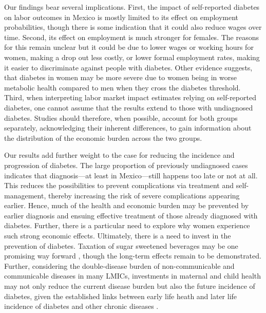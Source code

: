 \documentclass[12pt,english]{article}
\begin{document}
Our findings bear several implications. First, the impact of self-reported diabetes on labor outcomes in Mexico is mostly limited to its effect on employment probabilities, though there is some indication that it could also reduce wages over time. Second, its effect on employment is much stronger for females. The reasons for this remain unclear but it could be due to lower wages or working hours for women, making a drop out less costly, or lower formal employment rates, making it easier to discriminate against people with diabetes. Other evidence suggests, that diabetes in women may be more severe due to women being in worse metabolic health compared to men when they cross the diabetes threshold. Third, when interpreting labor market impact estimates relying on self-reported diabetes, one cannot assume that the results extend to those with undiagnosed diabetes. Studies should therefore, when possible, account for both groups separately, acknowledging their inherent differences, to gain information about the distribution of the economic burden across the two groups.

Our results add further weight to the case for reducing the incidence and progression of diabetes. The large proportion of previously undiagnosed cases indicates that diagnosis---at least in Mexico---still happens too late or not at all. This reduces the possibilities to prevent complications via treatment and self-management, thereby increasing the risk of severe complications appearing earlier. Hence, much of the health and economic burden may be prevented by earlier diagnosis and ensuing effective treatment of those already diagnosed with diabetes. Further, there is a particular need to explore why women experience such strong economic effects. Ultimately, there is a need to invest in the prevention of diabetes. Taxation of sugar sweetened beverages may be one promising way forward \parencite{Colchero2016}, though the long-term effects remain to be demonstrated. Further, considering the double-disease burden of non-communicable and communicable diseases in many \ac{LMICs}, investments in maternal and child health may not only reduce the current disease burden but also the future incidence of diabetes, given the established links between early life heath and later life incidence of diabetes and other chronic diseases \parencite{Sotomayor2013,Hanson2012,Li2010b}.
\end{document}
